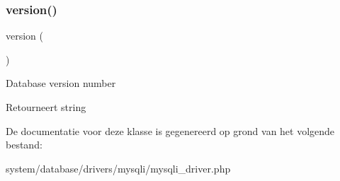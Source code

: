 \subsubsection{\texorpdfstring{version()}{version()}}
{\footnotesize\ttfamily version (\begin{DoxyParamCaption}{ }\end{DoxyParamCaption})}

Database version number

\begin{DoxyReturn}{Retourneert}
string 
\end{DoxyReturn}


De documentatie voor deze klasse is gegenereerd op grond van het volgende bestand\+:\begin{DoxyCompactItemize}
\item 
system/database/drivers/mysqli/mysqli\+\_\+driver.\+php\end{DoxyCompactItemize}

